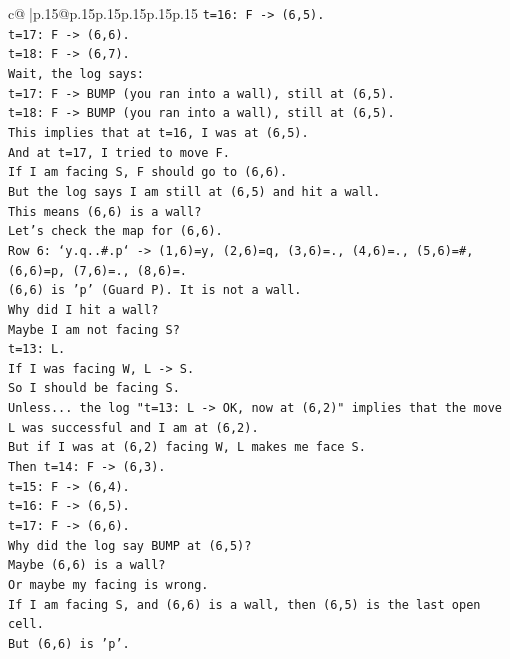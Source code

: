 \documentclass{article}
\begin{document}
{\begin{supertabular}{c@{$\;$}|p{.15\linewidth}@{}p{.15\linewidth}p{.15\linewidth}p{.15\linewidth}p{.15\linewidth}p{.15\linewidth}}
{{{\texttt{t=16: F {-}> (6,5).} \\
\texttt{t=17: F {-}> (6,6).} \\
\texttt{t=18: F {-}> (6,7).} \\
\texttt{Wait, the log says:} \\
\texttt{t=17: F {-}> BUMP (you ran into a wall), still at (6,5).} \\
\texttt{t=18: F {-}> BUMP (you ran into a wall), still at (6,5).} \\
\texttt{This implies that at t=16, I was at (6,5).} \\
\texttt{And at t=17, I tried to move F.} \\
\texttt{If I am facing S, F should go to (6,6).} \\
\texttt{But the log says I am still at (6,5) and hit a wall.} \\
\texttt{This means (6,6) is a wall?} \\
\texttt{Let's check the map for (6,6).} \\
\texttt{Row 6: `y.q..\#.p` {-}> (1,6)=y, (2,6)=q, (3,6)=., (4,6)=., (5,6)=\#, (6,6)=p, (7,6)=., (8,6)=.} \\
\texttt{(6,6) is 'p' (Guard P). It is not a wall.} \\
\texttt{Why did I hit a wall?} \\
\texttt{Maybe I am not facing S?} \\
\texttt{t=13: L.} \\
\texttt{If I was facing W, L {-}> S.} \\
\texttt{So I should be facing S.} \\
\texttt{Unless... the log "t=13: L {-}> OK, now at (6,2)" implies that the move L was successful and I am at (6,2).} \\
\texttt{But if I was at (6,2) facing W, L makes me face S.} \\
\texttt{Then t=14: F {-}> (6,3).} \\
\texttt{t=15: F {-}> (6,4).} \\
\texttt{t=16: F {-}> (6,5).} \\
\texttt{t=17: F {-}> (6,6).} \\
\texttt{Why did the log say BUMP at (6,5)?} \\
\texttt{Maybe (6,6) is a wall?} \\
\texttt{Or maybe my facing is wrong.} \\
\texttt{If I am facing S, and (6,6) is a wall, then (6,5) is the last open cell.} \\
\texttt{But (6,6) is 'p'.} \\
}}}
\end{supertabular}}
\end{document}
